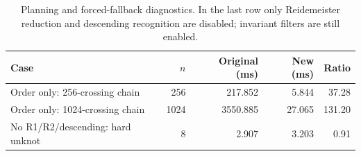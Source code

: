 \begin{table}[htbp]\centering\small
\begin{tabular}{@{}lrrrr@{}}
\toprule Case & $n$ & Original (ms) & New (ms) & Ratio \\
\midrule
Order only: 256-crossing chain & 256 & 217.852 & 5.844 & 37.28 \\
Order only: 1024-crossing chain & 1024 & 3550.885 & 27.065 & 131.20 \\
No R1/R2/descending: hard unknot & 8 & 2.907 & 3.203 & 0.91 \\
\bottomrule\end{tabular}
\caption{Planning and forced-fallback diagnostics. In the last row only Reidemeister reduction and descending recognition are disabled; invariant filters are still enabled.}\label{tab:aux}
\end{table}
